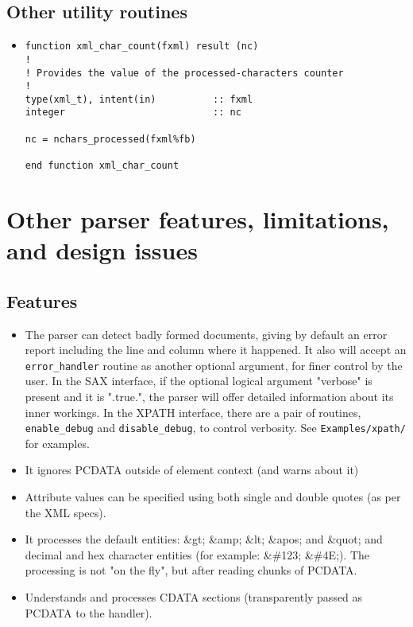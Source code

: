 \documentclass[11pt]{article}
\begin{document}
\subsection{Other utility routines}
\begin{itemize}
\item

\begin{verbatim}
function xml_char_count(fxml) result (nc)
!
! Provides the value of the processed-characters counter
!
type(xml_t), intent(in)          :: fxml
integer                          :: nc

nc = nchars_processed(fxml%fb)

end function xml_char_count
\end{verbatim}
\end{itemize}

\section{Other parser features, limitations, and design issues}

\subsection{Features}
\begin{itemize}
\item 
The parser can detect badly formed documents, giving by default an
error report including the line and column where it happened. It also
will accept an \texttt{error\_handler} routine as another optional
argument, for finer control by the user. In the SAX interface, if the
optional logical argument "verbose" is present and it is ".true.", the
parser will offer detailed information about its inner workings. In
the XPATH interface, there are a pair of routines,
\texttt{enable\_debug} and \texttt{disable\_debug}, to control
verbosity. See \texttt{Examples/xpath/} for examples.

\item
It ignores PCDATA outside of element context (and warns about it)

\item
Attribute values can be specified using both single and double
quotes (as per the XML specs).

\item 
It processes the default entities: \&gt; \&amp; \&lt;  \&apos; and
\&quot; and decimal and hex character entities (for example: \&\#123;
\&\#4E;).  The processing is not
"on the fly", but after reading chunks of PCDATA.

\item
Understands and processes CDATA sections (transparently passed as
PCDATA to the handler).

\end{itemize}
\end{document}
